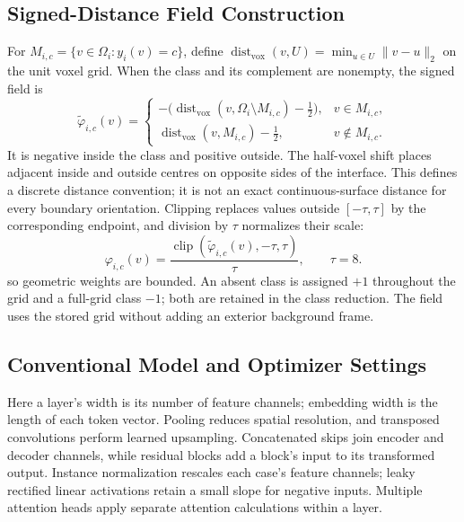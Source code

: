 \documentclass[12pt,a4paper]{article}
\begin{document}
\subsection{Signed-Distance Field Construction}
\label{sec:sdf-construction-details}

For $M_{i,c}=\{v\in\Omega_i:y_i(v)=c\}$, define
$\operatorname{dist}_{\mathrm{vox}}(v,U)=\min_{u\in U}\|v-u\|_2$
on the unit voxel grid. When the class and its complement are nonempty,
the signed field is
\begin{equation}
\widetilde\varphi_{i,c}(v)=
\begin{cases}
-\bigl(\operatorname{dist}_{\mathrm{vox}}
       (v,\Omega_i\setminus M_{i,c})-\tfrac12\bigr),
   &v\in M_{i,c},\\[0.4em]
\operatorname{dist}_{\mathrm{vox}}(v,M_{i,c})-\tfrac12,
   &v\notin M_{i,c}.
\end{cases}
\label{eq:sdf-half-voxel-field}
\end{equation}
It is negative inside the class and positive outside. The half-voxel
shift places adjacent inside and outside centres on opposite sides of
the interface. This defines a discrete distance convention; it is not
an exact continuous-surface distance for every boundary orientation.
Clipping replaces values outside $[-\tau,\tau]$ by the corresponding
endpoint, and division by $\tau$ normalizes their scale:
\begin{equation}
\varphi_{i,c}(v)
=\frac{\operatorname{clip}
  (\widetilde\varphi_{i,c}(v),-\tau,\tau)}{\tau},
\qquad \tau=8.
\label{eq:sdf-clipped-normalized-field}
\end{equation}
so geometric weights are bounded. An absent class is assigned $+1$
throughout the grid and a full-grid class $-1$; both are retained in
the class reduction. The field uses the stored grid without adding an
exterior background frame.


\subsection{Conventional Model and Optimizer Settings}
\label{sec:conventional-implementation}

Here a layer's width is its number of feature channels; embedding width is
the length of each token vector. Pooling reduces spatial resolution, and
transposed convolutions perform learned upsampling. Concatenated skips join
encoder and decoder channels, while residual blocks add a block's input to
its transformed output. Instance normalization rescales each case's feature
channels; leaky rectified linear activations retain a small slope for
negative inputs. Multiple attention heads apply separate attention
calculations within a layer.
\end{document}
